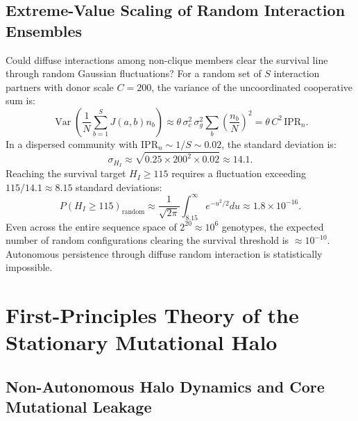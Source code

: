 \documentclass[11pt,a4paper]{article}
\begin{document}
\subsection{Extreme-Value Scaling of Random Interaction Ensembles}

Could diffuse interactions among non-clique members clear the survival line through random Gaussian fluctuations? For a random set of $S$ interaction partners with donor scale $C = 200$, the variance of the uncoordinated cooperative sum is:
\begin{equation}
\operatorname{Var}\left( \frac{1}{N} \sum_{b=1}^S J(a,b) n_b \right) \approx \theta \, \sigma_c^2 \, \sigma_g^2 \sum_b \left( \frac{n_b}{N} \right)^2 = \theta \, C^2 \, \mathrm{IPR}_n.
\end{equation}
In a dispersed community with $\mathrm{IPR}_n \sim 1/S \sim 0.02$, the standard deviation is:
\begin{equation}
\sigma_{H_I} \approx \sqrt{0.25 \times 200^2 \times 0.02} \approx 14.1.
\end{equation}
Reaching the survival target $H_I \ge 115$ requires a fluctuation exceeding $115 / 14.1 \approx 8.15$ standard deviations:
\begin{equation}
P(H_I \ge 115)_{\mathrm{random}} \approx \frac{1}{\sqrt{2\pi}} \int_{8.15}^\infty e^{-u^2/2} du \approx 1.8 \times 10^{-16}.
\end{equation}
Even across the entire sequence space of $2^{20} \approx 10^6$ genotypes, the expected number of random configurations clearing the survival threshold is $\approx 10^{-10}$. Autonomous persistence through diffuse random interaction is statistically impossible.

\section{First-Principles Theory of the Stationary Mutational Halo}
\label{sec:halo}

\subsection{Non-Autonomous Halo Dynamics and Core Mutational Leakage}
\end{document}
